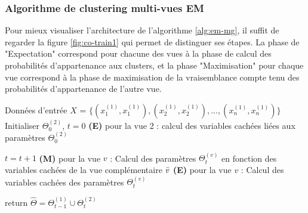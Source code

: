 \documentclass[12pt, french, latin.medieval, a4paper]{report}
\begin{document}
        	\subsubsection{Algorithme de clustering multi-vues EM}
            	Pour mieux visualiser l'architecture de l'algorithme \ref{alg:em-mg}, il suffit de regarder la figure \ref{fig:co-train1} qui permet de distinguer ses étapes.
            	La phase de "Expectation" correspond pour chacune des vues à la phase de calcul des probabilités d'appartenance aux clusters, et la phase "Maximisation" pour chaque vue correspond à
            	la phase de maximisation de la vraisemblance compte tenu des probabilités d'appartenance de l'autre vue.
            	\begin{algorithm}[H]
                	\caption{Pseudo code de l'algorithme multi-vues EM \cite{bickel2004multi}}
                	\label{alg:em-mg}
                	\begin{algorithmic}[1]
                 	\REQUIRE Données d'entrée $X$ = $\{ (x_{1}^{(1)}, x_{1}^{(1)}), (x_{2}^{(1)}, x_{2}^{(1)}), ..., (x_{n}^{(1)}, x_{n}^{(1)}) \}$
                 	\STATE Initialiser $\Theta_{0}^{(2)}$, $t=0$
                 	\STATE \textbf{(E)} pour la vue 2 : calcul des variables cachées liées aux paramètres $\Theta_{0}^{(2)}$
  	 
                       	\STATE $t = t+1$
                       	\STATE \textbf{(M)} pour la vue $v$ : Calcul des paramètres $\Theta_{t}^{(v)}$ en fonction des variables cachées de la vue complémentaire $\Bar{v}$
                       	\STATE \textbf{(E)} pour la vue $v$ : Calcul des variables cachées des paramètres $\Theta_{t}^{(v)}$
                   	\ENDFOR
                   	 
                 	\ENDWHILE
                 	\STATE return $\hat{\Theta} = \Theta_{t-1}^{(1)} \cup \Theta_{t}^{(2)}$
                	\end{algorithmic}
           	\end{algorithm}
       	 
\end{document}
